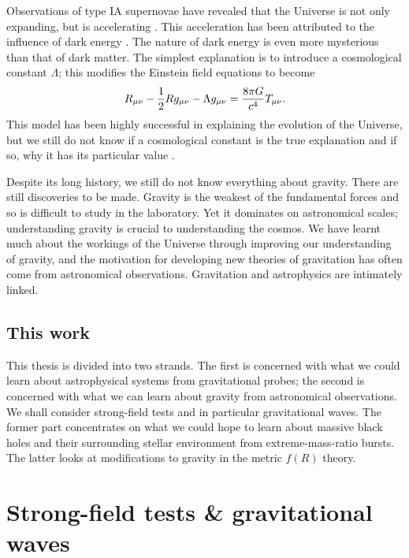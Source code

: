 Observations of type IA supernovae have revealed that the Universe is not only expanding, but is accelerating \citep{Riess1998,Perlmutter1999}. This acceleration has been attributed to the influence of dark energy \citep{Perlmutter1999a,Peebles2003}. The nature of dark energy is even more mysterious than that of dark matter. The simplest explanation is to introduce a cosmological constant $\Lambda$; this modifies the Einstein field equations to become \citep[document 43]{Einstein1997}
\begin{equation}
R_{\mu\nu} - \frac{1}{2}R g_{\mu\nu} - \Lambda g_{\mu\nu} = \frac{8\pi G}{c^4}T_{\mu\nu}.
\end{equation}
This model has been highly successful in explaining the evolution of the Universe, but we still do not know if a cosmological constant is the true explanation and if so, why it has its particular value \citep{Carroll2001}.

Despite its long history, we still do not know everything about gravity. There are still discoveries to be made. Gravity is the weakest of the fundamental forces and so is difficult to study in the laboratory. Yet it dominates on astronomical scales; understanding gravity is crucial to understanding the cosmos. We have learnt much about the workings of the Universe through improving our understanding of gravity, and the motivation for developing new theories of gravitation has often come from astronomical observations. Gravitation and astrophysics are intimately linked.

\subsection{This work}

This thesis is divided into two strands. The first is concerned with what we could learn about astrophysical systems from gravitational probes; the second is concerned with what we can learn about gravity from astronomical observations.  We shall consider strong-field tests and in particular gravitational waves. The former part concentrates on what we could hope to learn about massive black holes and their surrounding stellar environment from extreme-mass-ratio bursts. The latter looks at modifications to gravity in the metric $f(R)$ theory.

\section{Strong-field tests \& gravitational waves}


